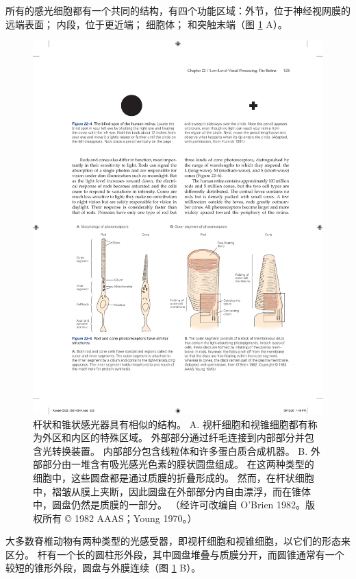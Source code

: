 所有的感光细胞都有一个共同的结构，有四个功能区域：外节，位于神经视网膜的远端表面； 内段，位于更近端； 细胞体； 和突触末端（图 \ref{fig:22_5} A）。

\begin{figure}[htbp]
	\centering
	\includegraphics[width=1.0\linewidth]{chap22/fig_22_5}
	\caption{杆状和锥状感光器具有相似的结构。 
		A. 视杆细胞和视锥细胞都有称为外区和内区的特殊区域。 
		外部部分通过纤毛连接到内部部分并包含光转换装置。 
		内部部分包含线粒体和许多蛋白质合成机器。 
		B. 外部部分由一堆含有吸光感光色素的膜状圆盘组成。 
		在这两种类型的细胞中，这些圆盘都是通过质膜的折叠形成的。 
		然而，在杆状细胞中，褶皱从膜上夹断，因此圆盘在外部部分内自由漂浮，而在锥体中，圆盘仍然是质膜的一部分。 （经许可改编自 O'Brien 1982。版权所有 © 1982 AAAS；Young 1970。）}
	\label{fig:22_5}
\end{figure}


大多数脊椎动物有两种类型的光感受器，即视杆细胞和视锥细胞，以它们的形态来区分。 
杆有一个长的圆柱形外段，其中圆盘堆叠与质膜分开，而圆锥通常有一个较短的锥形外段，圆盘与外膜连续（图 \ref{fig:22_5} B）。


